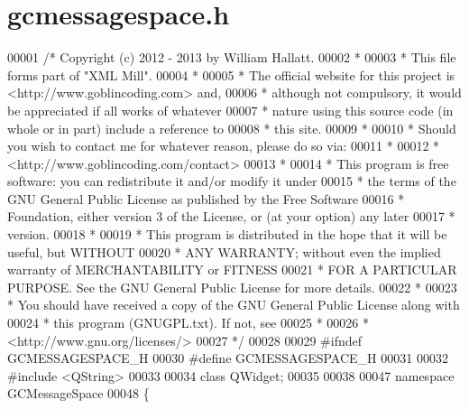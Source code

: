 \hypertarget{gcmessagespace_8h_source}{\section{gcmessagespace.\-h}
}

\begin{DoxyCode}
00001 \textcolor{comment}{/* Copyright (c) 2012 - 2013 by William Hallatt.}
00002 \textcolor{comment}{ *}
00003 \textcolor{comment}{ * This file forms part of "XML Mill".}
00004 \textcolor{comment}{ *}
00005 \textcolor{comment}{ * The official website for this project is <http://www.goblincoding.com> and,}
00006 \textcolor{comment}{ * although not compulsory, it would be appreciated if all works of whatever}
00007 \textcolor{comment}{ * nature using this source code (in whole or in part) include a reference to}
00008 \textcolor{comment}{ * this site.}
00009 \textcolor{comment}{ *}
00010 \textcolor{comment}{ * Should you wish to contact me for whatever reason, please do so via:}
00011 \textcolor{comment}{ *}
00012 \textcolor{comment}{ *                 <http://www.goblincoding.com/contact>}
00013 \textcolor{comment}{ *}
00014 \textcolor{comment}{ * This program is free software: you can redistribute it and/or modify it
       under}
00015 \textcolor{comment}{ * the terms of the GNU General Public License as published by the Free
       Software}
00016 \textcolor{comment}{ * Foundation, either version 3 of the License, or (at your option) any later}
00017 \textcolor{comment}{ * version.}
00018 \textcolor{comment}{ *}
00019 \textcolor{comment}{ * This program is distributed in the hope that it will be useful, but WITHOUT}
00020 \textcolor{comment}{ * ANY WARRANTY; without even the implied warranty of MERCHANTABILITY or
       FITNESS}
00021 \textcolor{comment}{ * FOR A PARTICULAR PURPOSE.  See the GNU General Public License for more
       details.}
00022 \textcolor{comment}{ *}
00023 \textcolor{comment}{ * You should have received a copy of the GNU General Public License along with}
00024 \textcolor{comment}{ * this program (GNUGPL.txt).  If not, see}
00025 \textcolor{comment}{ *}
00026 \textcolor{comment}{ *                    <http://www.gnu.org/licenses/>}
00027 \textcolor{comment}{ */}
00028 
00029 \textcolor{preprocessor}{#ifndef GCMESSAGESPACE\_H}
00030 \textcolor{preprocessor}{}\textcolor{preprocessor}{#define GCMESSAGESPACE\_H}
00031 \textcolor{preprocessor}{}
00032 \textcolor{preprocessor}{#include <QString>}
00033 
00034 \textcolor{keyword}{class }QWidget;
00035 
00038 
00047 \textcolor{keyword}{namespace }GCMessageSpace
00048 \{  

\end{DoxyCode}
